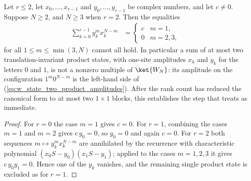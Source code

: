 \begin{lemma}\label{thm:w_state_two_product_states}
    \leanok
    Let $r\leq2$, let $x_0,\ldots,x_{r-1}$ and $y_0,\ldots,y_{r-1}$ be complex
    numbers, and let $c\neq0$. Suppose $N\geq2$, and $N\geq3$ when $r=2$. Then
    the equalities
    \begin{align}
        \sum_{k=0}^{r-1}y_k^{m}x_k^{N-m} & =
        \begin{cases}
            c & m=1,   \\
            0 & m=2,3,
        \end{cases}
        \label{eq:w_state_two_product_amplitudes}
    \end{align}
    for all $1\leq m\leq\min(3,N)$ cannot all hold. In particular a sum of at most
    two translation-invariant product states, with one-site amplitudes $x_k$
    and $y_k$ for the letters $0$ and $1$, is not a nonzero multiple of
    $\ket{W_N}$: its amplitude on the configuration $1^m0^{N-m}$ is the left-hand
    side of (\ref{eq:w_state_two_product_amplitudes}). After the rank count has
    reduced the canonical form to at most two $1\times1$ blocks, this
    establishes the step that \cite[lines~2208--2210]{PerezGarcia2007Matrix}
    treats as immediate.
\end{lemma}

\begin{proof}
    \leanok
    For $r=0$ the case $m=1$ gives $c=0$. For $r=1$, combining the cases $m=1$
    and $m=2$ gives $c\,y_0=0$, so $y_0=0$ and again $c=0$. For $r=2$ both
    sequences $m\mapsto y_k^mx_k^{N-m}$ are annihilated by the recurrence with
    characteristic polynomial $(x_0S-y_0)(x_1S-y_1)$; applied to the cases
    $m=1,2,3$ it gives $c\,y_0y_1=0$. Hence one of the $y_k$ vanishes, and the
    remaining single product state is excluded as for $r=1$.
\end{proof}

